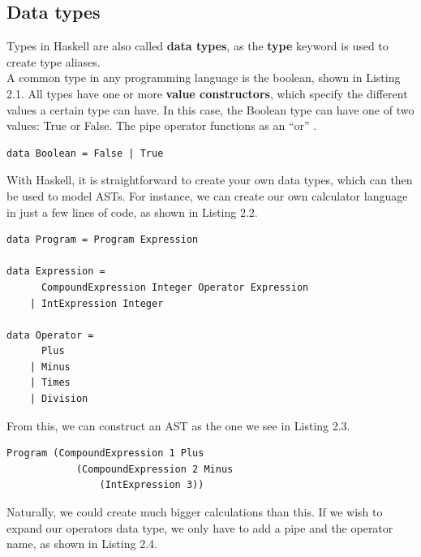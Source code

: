 \subsection{Data types}

Types in Haskell are also called \textbf{data types}, as the \textbf{type} keyword is used to create type aliases. \hfill \\

A common type in any programming language is the boolean, shown in Listing 2.1. All types have one or more \textbf{value constructors}, which specify the different values a certain type can have. In this case, the Boolean type can have one of two values: True or False. The pipe operator functions as an ``or'' \cite[be stian om å sjekke hvilken side dette eksemplet er på i boka]{LYAH}. \hfill \\

\begin{lstlisting}[caption={Recreating the Boolean data type with Haskell}, captionpos=b]
data Boolean = False | True
\end{lstlisting}

With Haskell, it is straightforward to create your own data types, which can then be used to model ASTs. For instance, we can create our own calculator language in just a few lines of code, as shown in Listing 2.2. \hfill \\

\begin{lstlisting}[caption={Example data types in Haskell}, captionpos=b]
data Program = Program Expression

data Expression =
      CompoundExpression Integer Operator Expression
    | IntExpression Integer

data Operator =
      Plus
    | Minus
    | Times
    | Division
\end{lstlisting}

From this, we can construct an AST as the one we see in Listing 2.3. \hfill \\

\begin{lstlisting}[caption={An AST constructed with data types presented in Listing 2.2}, captionpos=b]
Program (CompoundExpression 1 Plus
            (CompoundExpression 2 Minus
                (IntExpression 3))
\end{lstlisting}

Naturally, we could create much bigger calculations than this. If we wish to expand our operators data type, we only have to add a pipe and the operator name, as shown in Listing 2.4. \hfill \\

